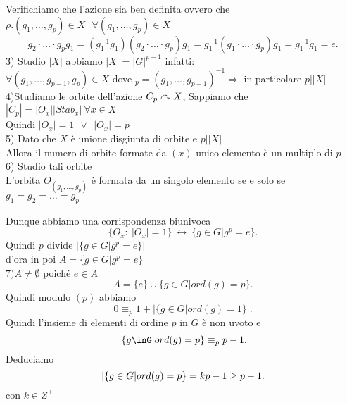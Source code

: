 \documentclass[12px]{article}
\begin{document}
{\begin{dimo}
Verifichiamo che l'azione sia ben definita ovvero che\\ $\rho.(g_1,\ldots,g_p)\in X \ \ \ \forall (g_1,\ldots,g_p)\in X$
\[
	g_2\cdot\ldots\cdot g_pg_1 = (g_1^{-1}g_1)(g_2\cdot\ldots\cdot g_p)g_1 = g_1^{-1}(g_1\cdot\ldots\cdot g_p)g_1 = g_1^{-1}g_1 = e
.\] 
3) Studio $| X|$ abbiamo   $|X| = |G|^{p-1}$ infatti:\\
$\forall (g_1,\ldots, g_{p-1},g_p)\in X$ dove $_p = (g_1,\ldots,g_{p-1})^{-1} \Rightarrow$ in particolare $p | |X|$ \\
4)Studiamo le orbite dell'azione $C_p\curvearrowright X$, Sappiamo che  $|C_p| = |O_x||Stab_x| \ \forall x\in X$\\
Quindi  $|O_x| = 1 \ \ \vee\ \  |O_x| = p$\\
5) Dato che $X$ è unione disgiunta di orbite e $p | |X|$\\
Allora il numero di orbite formate da  $(x)$ unico elemento è un multiplo di  $p$\\
6) Studio tali orbite\\
L'orbita  $O_{(g_1,\ldots,g_p)}$ è formata da un singolo elemento se e solo se\\ $g_1 = g_2=\ldots=g_p$
 \end{dimo}
 Dunque abbiamo una corrispondenza biunivoca 
 \[
	 \{O_x : \ |O_x| = 1\} \ \leftrightarrow \  \{g\in G | g^p = e\}
 .\] 
 Quindi $p$ divide $|\{g\in G|g^p = e\}| $\\
 d'ora in poi  $ A = \{g\in G | g^p = e\}$\\
  $7) A \neq\emptyset$ poiché  $e\in A$\\
 \[
	 A = \{e\}\cup \{g\in G | ord(g) = p\}
.\] 
Quindi modulo $(p)$ abbiamo
\[
	0\equiv_p 1 + |\{g\in G | ord(g) = 1\}|
.\] 
Quindi l'insieme di elementi di ordine $p$ in  $G$ è non uvoto e 
\[
	|\{g\inG|ord(g)=p\} \equiv_p p - 1
.\] 
Deduciamo 
\[
	|\{g\in G | ord(g) = p\} = kp-1\geq p-1\\
.\] 
con $k\in Z^+$
}
\end{document}
